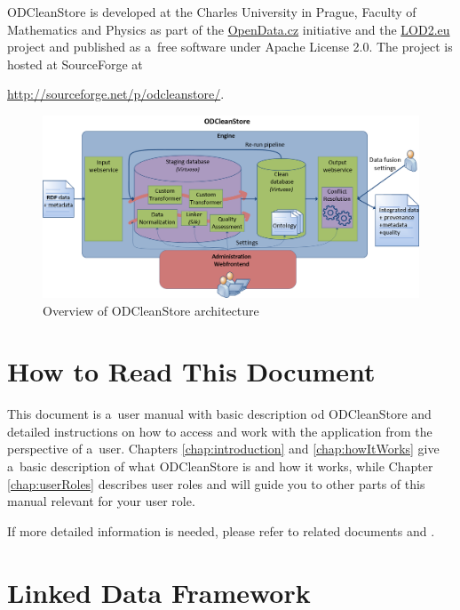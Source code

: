 ODCleanStore is developed at the Charles University in Prague, Faculty of Mathematics and Physics as part of the \href{http://opendata.cz}{OpenData.cz} initiative and the \href{http://lod2.eu}{LOD2.eu} project and published as a~free software under Apache License 2.0. The project is hosted at SourceForge at
\begin{center}
  \url{http://sourceforge.net/p/odcleanstore/}.
\end{center}

\begin{figure}[htb]
    \centering
    \includegraphics[width=\textwidth]{images/odcs-internal.png}
    \caption{Overview of ODCleanStore architecture}
	\label{fig:odcsInternal}
\end{figure}

\section{How to Read This Document}

This document is a~user manual with basic description od ODCleanStore and detailed instructions on how to access and work with the application from the perspective of a~user. Chapters \ref{chap:introduction} and \ref{chap:howItWorks} give a~basic description of what ODCleanStore is and how it works, while Chapter \ref{chap:userRoles} describes user roles and will guide you to other parts of this manual relevant for your user role.

If more detailed information is needed, please refer to related documents  and .


\section{Linked Data Framework}

